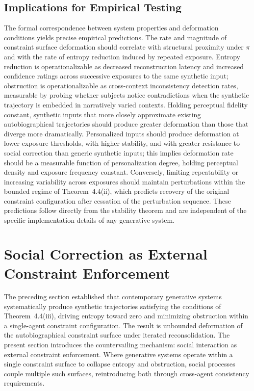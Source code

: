 \documentclass[12pt, a4paper]{article}
\begin{document}
\subsection{Implications for Empirical Testing}

The formal correspondence between system properties and deformation conditions yields precise empirical predictions. The rate and magnitude of constraint surface deformation should correlate with structural proximity under $\pi$ and with the rate of entropy reduction induced by repeated exposure. Entropy reduction is operationalizable as decreased reconstruction latency and increased confidence ratings across successive exposures to the same synthetic input; obstruction is operationalizable as cross-context inconsistency detection rates, measurable by probing whether subjects notice contradictions when the synthetic trajectory is embedded in narratively varied contexts. Holding perceptual fidelity constant, synthetic inputs that more closely approximate existing autobiographical trajectories should produce greater deformation than those that diverge more dramatically. Personalized inputs should produce deformation at lower exposure thresholds, with higher stability, and with greater resistance to social correction than generic synthetic inputs; this implies deformation rate should be a measurable function of personalization degree, holding perceptual density and exposure frequency constant. Conversely, limiting repeatability or increasing variability across exposures should maintain perturbations within the bounded regime of Theorem~4.4(ii), which predicts recovery of the original constraint configuration after cessation of the perturbation sequence. These predictions follow directly from the stability theorem and are independent of the specific implementation details of any generative system.

\section{Social Correction as External Constraint Enforcement}

The preceding section established that contemporary generative systems systematically produce synthetic trajectories satisfying the conditions of Theorem~4.4(iii), driving entropy toward zero and minimizing obstruction within a single-agent constraint configuration. The result is unbounded deformation of the autobiographical constraint surface under iterated reconsolidation. The present section introduces the countervailing mechanism: social interaction as external constraint enforcement. Where generative systems operate within a single constraint surface to collapse entropy and obstruction, social processes couple multiple such surfaces, reintroducing both through cross-agent consistency requirements.
\end{document}
